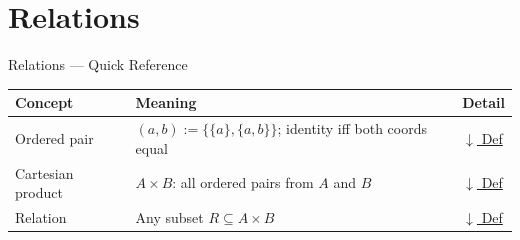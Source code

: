 \section{Relations}


\begin{toolkitbox}{Relations --- Quick Reference}
\small
\begin{tabular}{l l l}
\toprule
\textbf{Concept} & \textbf{Meaning} & \textbf{Detail} \\
\midrule
Ordered pair     & $(a,b) := \{\{a\},\{a,b\}\}$; identity iff both coords equal  & \hyperref[def:ordered-pair]{$\downarrow$ Def} \\
Cartesian product & $A \times B$: all ordered pairs from $A$ and $B$             & \hyperref[def:cartesian-product-rel]{$\downarrow$ Def} \\
Relation         & Any subset $R \subseteq A \times B$                           & \hyperref[def:relation]{$\downarrow$ Def} \\
\bottomrule
\end{tabular}
\end{toolkitbox}



